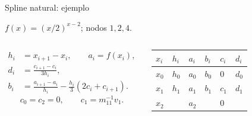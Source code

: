 \documentclass[original_version/main.tex]{subfiles}
\begin{document}
\begin{frame}[t]{Spline natural: ejemplo}
\par\noindent\begin{minipage}[t][9mm][t]{\textwidth}\small\strut $f(x)=(x/2)^{x-2}$; nodos $1,2,4$.\end{minipage}\par\nointerlineskip
\begin{columns}[T]\scriptsize\begin{align*}
h_i&=x_{i+1}-x_i,\qquad a_i=f(x_i),\\
d_i&=\frac{c_{i+1}-c_i}{3h_i},\\
b_i&=\frac{a_{i+1}-a_i}{h_i}-\frac{h_i}{3}(2c_i+c_{i+1}).
\end{align*}\scriptsize\[c_0=c_2=0,\qquad c_1=m_{11}^{-1}v_1.\]\begin{minipage}[t]{\textwidth}\begingroup\scriptsize\setlength{\tabcolsep}{2pt}\begin{center}\begin{tabular}{|C{.12\textwidth}|C{.12\textwidth}|C{.12\textwidth}|C{.12\textwidth}|C{.12\textwidth}|C{.12\textwidth}|}\hline
\rule[-2mm]{0pt}{6mm}$x_i$&$h_i$&$a_i$&$b_i$&$c_i$&$d_i$\\\hline
\rule[-2.5mm]{0pt}{7mm}$x_0$&$h_0$&$a_0$&$b_0$&$0$&$d_0$\\\hline
\rule[-2.5mm]{0pt}{7mm}$x_1$&$h_1$&$a_1$&$b_1$&$c_1$&$d_1$\\\hline
\rule[-2.5mm]{0pt}{7mm}$x_2$&&$a_2$&&$0$&\\\hline
\end{tabular}\end{center}\endgroup\end{minipage}\par
\end{columns}
\end{frame}
\end{document}
